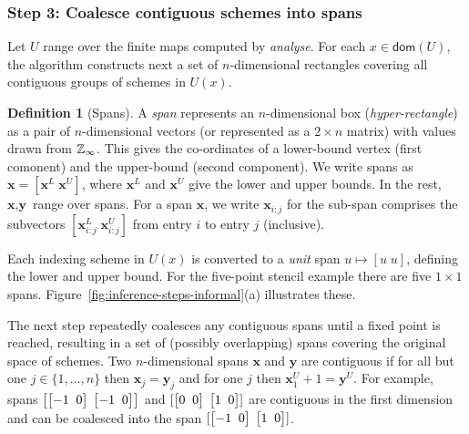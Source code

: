 \documentclass[9pt]{sigplanconf}
\newcounter{block}
\theoremstyle{definition}
\newtheorem{definition}[block]{Definition}
\newcommand{\vect}[1]{\textbf{#1}}
\newcommand{\vtwoh}[2]{\setlength{\arraycolsep}{0em}
\left[\begin{array}{cc}#1 \; & \; #2\end{array}\right]}
\begin{document}
\subsubsection{Step 3: Coalesce contiguous schemes into spans}
\label{sec:inf-step3}

Let $U$ range over the finite maps computed by \textit{analyse}.  For
each $x \in \mathsf{dom}(U)$, the algorithm 
constructs next a set of $n$-dimensional rectangles covering all contiguous groups of schemes
in $U(x)$. 

\newcommand{\spanOp}{\textsf{spans}}

\begin{definition}[Spans]
  A \emph{span} represents an $n$-dimensional box
  (\emph{hyper-rectangle}) as a pair of $n$-dimensional vectors (or
  represented as a $2 \times n$ matrix) with values drawn from
  $\mathbb{Z}_\infty{}$. This gives the co-ordinates of a lower-bound vertex
  (first comonent) and the upper-bound (second component). We write 
  spans as $\vect{x} = [\vect{x}^L \; \vect{x}^U]$, where $\vect{x}^L$
  and $\vect{x}^U$ give the lower and upper bounds.  In
  the rest, $\vect{x}, \vect{y}$ range over spans.  For a span
  $\vect{x}$, we write $\vect{x}_{i:j}$ for the sub-span comprises the
  subvectors $[\vect{x}^L_{i:j} \; \vect{x}^U_{i:j}]$ from entry $i$
  to entry $j$ (inclusive).
\end{definition}

\noindent
Each indexing scheme in $U(x)$ is converted to a \emph{unit} span $u \mapsto [u \; 
u]$, defining the lower and upper bound.
 For the five-point stencil example there are five $1 \times 1$ spans.
Figure~\ref{fig:inference-steps-informal}(a) illustrates these.

The next step repeatedly coalesces any contiguous spans
until a fixed point is reached, resulting in a set of (possibly
overlapping) spans covering the original space of schemes. Two $n$-dimensional spans $\vect{x}$ and $\vect{y}$
are contiguous if for all but one $j \in \{1, \ldots, n\}$ then
$\vect{x}_j = \vect{y}_j$ and for one $j$ then $\vect{x}^U_1 + 1 =
\vect{y}^U$. For example, spans
$\left[\vtwoh{-1}{0}\; \vtwoh{-1}{0}\right]$ and $[\vtwoh{0}{0} \; \vtwoh{1}{0}]$ 
are contiguous in the first dimension and can be coalesced
into the span $[\vtwoh{-1}{0} \; \vtwoh{1}{0}]$.
\end{document}
